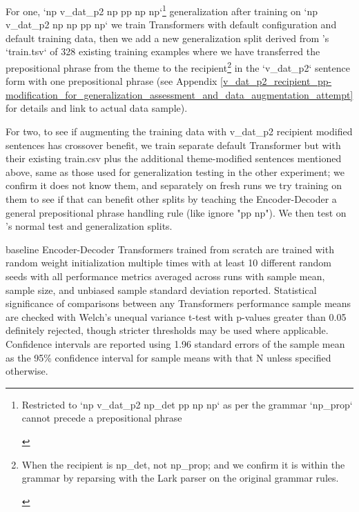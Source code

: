 \documentclass[11pt]{article}
\begin{document}
For one, `np v\_dat\_p2 np pp np np`\footnote{\begin{footnotesize}Restricted to `np v\_dat\_p2 np\_det pp np np` as per the grammar `np\_prop` cannot precede a prepositional phrase\end{footnotesize}} generalization after training on `np v\_dat\_p2 np np pp np` we train \citep{Wu2023} Transformers with default configuration and default training data, then we add a new generalization split derived from \citep{Wu2023}'s `train.tsv` of 328 existing training examples where we have transferred the prepositional phrase from the theme to the recipient\footnote{\begin{footnotesize}When the recipient is np\_det, not np\_prop; and we confirm it is within the grammar by reparsing with the Lark parser on the original grammar rules.\end{footnotesize}} in the `v\_dat\_p2` sentence form with one prepositional phrase (see Appendix \ref{v_dat_p2_recipient_pp-modification_for_generalization_assessment_and_data_augmentation_attempt} for details and link to actual data sample).

For two, to see if augmenting the training data with v\_dat\_p2 recipient modified sentences has crossover benefit, we train separate default \citep{Wu2023} Transformer but with their existing train.csv plus the additional theme-modified sentences mentioned above, same as those used for generalization testing in the other experiment; we confirm it does not know them, and separately on fresh runs we try training on them to see if that can benefit other splits by teaching the Encoder-Decoder a general prepositional phrase handling rule (like ignore "pp np"). We then test on \citep{Wu2023}'s normal test and generalization splits.

\citep{Wu2023} baseline Encoder-Decoder Transformers trained from scratch are trained with random weight initialization multiple times with at least 10 different random seeds with all performance metrics averaged across runs with sample mean, sample size, and unbiased sample standard deviation reported. Statistical significance of comparisons between any Transformers performance sample means are checked with Welch's unequal variance t-test with p-values greater than 0.05 definitely rejected, though stricter thresholds may be used where applicable. Confidence intervals are reported using 1.96 standard errors of the sample mean as the 95\% confidence interval for sample means with that N unless specified otherwise.
\end{document}
